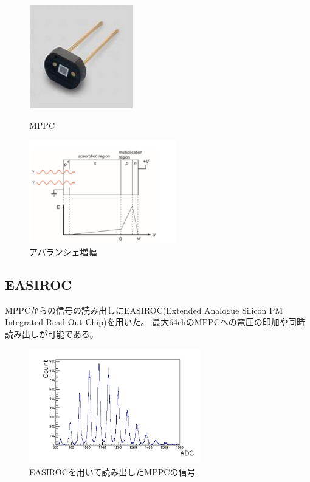 \begin{figure}[H]
    \begin{minipage}[b]{0.47\linewidth}
        \centering
        \includegraphics[height=4.5cm]{img/1_mppc.jpg}
        \caption{MPPC}
    \end{minipage}
    \begin{minipage}[b]{0.47\linewidth}
        \centering
        \includegraphics[height=4.5cm]{img/avalanche.jpg}
        \caption{アバランシェ増幅}
    \end{minipage}
\end{figure}

\subsection{EASIROC}
MPPCからの信号の読み出しにEASIROC(Extended Analogue Silicon PM Integrated Read Out Chip)を用いた。
最大64chのMPPCへの電圧の印加や同時読み出しが可能である。

\begin{figure}[H]
    \centering
    \includegraphics[height=5cm]{img/mppc_easiroc.jpg}
    \caption{EASIROCを用いて読み出したMPPCの信号}
\end{figure}

